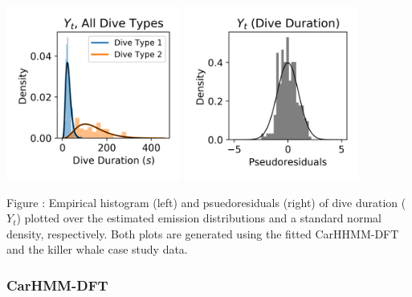 \documentclass{article}
\begin{document}
        \begin{center}
        \includegraphics[width=2.25in]{../Plots/CarHHMM1_empirical_hist_dive_duration.png}
        \includegraphics[width=2.25in]{../Plots/CarHHMM1_psedoresids_Dive_Duration.png}
        \end{center}
        
        \noindent Figure : Empirical histogram (left) and psuedoresiduals (right) of dive duration ($Y_{t}$) plotted over the estimated emission distributions and a standard normal density, respectively. Both plots are generated using the fitted CarHHMM-DFT and the killer whale case study data.
        \addtocounter{fignum}{1}
        
        \subsubsection{CarHMM-DFT}
        
\end{document}
